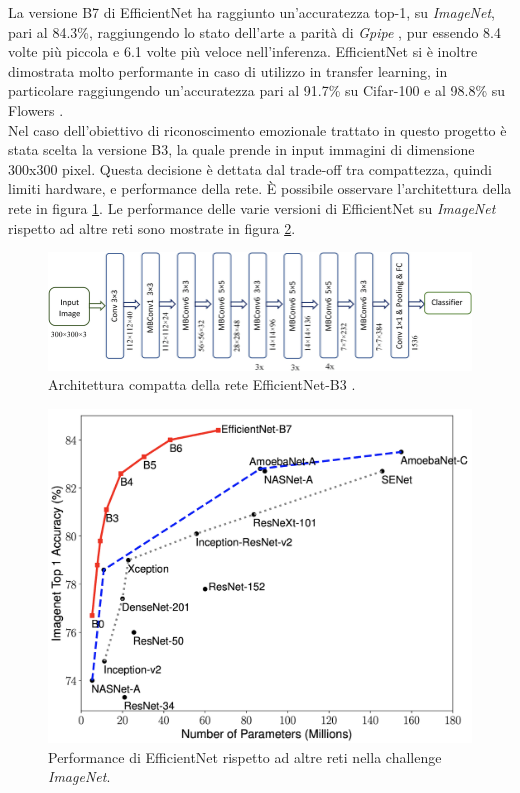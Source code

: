\documentclass[11pt]{report}
\begin{document}
        La versione B7 di EfficientNet ha raggiunto un'accuratezza top-1, su \textit{ImageNet}, pari al 84.3\%, raggiungendo lo stato dell'arte a parità di \textit{Gpipe} \cite{huang2019gpipe}, pur essendo 8.4 volte più piccola e 6.1 volte più veloce nell'inferenza.
        EfficientNet si è inoltre dimostrata molto performante in caso di utilizzo in transfer learning, in particolare raggiungendo un'accuratezza pari al 91.7\% su Cifar-100 \cite{cifar} e al 98.8\% su Flowers \cite{flowers}.\\
        
        Nel caso dell'obiettivo di riconoscimento emozionale trattato in questo progetto è stata scelta la versione B3, la quale prende in input immagini di dimensione 300x300 pixel. Questa decisione è dettata dal trade-off tra compattezza, quindi limiti hardware, e performance della rete. È possibile osservare l'architettura della rete in figura \ref{fig:efficientnet-arch}.
        Le performance delle varie versioni di EfficientNet su \textit{ImageNet} rispetto ad altre reti sono mostrate in figura \ref{fig:efficientnet}.

\begin{figure}[h]
    \centering
    \includegraphics[scale=2]{img/Schematic-representation-of-EfficientNet-B3.png}
    \caption{Architettura compatta della rete EfficientNet-B3 \cite{effnetb3-arch}.}
    \label{fig:efficientnet-arch}
\end{figure}

\newpage


\begin{figure}
    \centering
    \includegraphics[scale=0.2]{img/efficientnet-performance.png}
    \caption{Performance di EfficientNet rispetto ad altre reti nella challenge \textit{ImageNet}.}
    \label{fig:efficientnet}
\end{figure}
\end{document}
